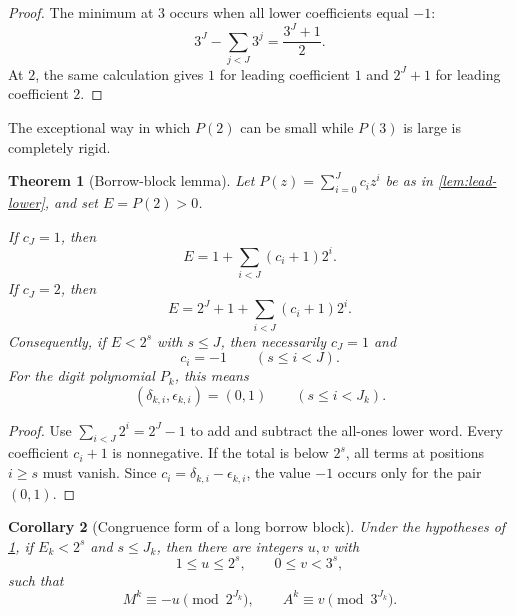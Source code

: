 \documentclass[11pt]{article}
\newtheorem{theorem}{Theorem}[section]
\newtheorem{corollary}[theorem]{Corollary}
\theoremstyle{definition}
\begin{document}
\begin{proof}
The minimum at \(3\) occurs when all lower coefficients equal \(-1\):
\[
 3^J-\sum_{j<J}3^j=\frac{3^J+1}{2}.
\]
At \(2\), the same calculation gives \(1\) for leading coefficient \(1\)
and \(2^J+1\) for leading coefficient \(2\).
\end{proof}

The exceptional way in which \(P(2)\) can be small while \(P(3)\) is large
is completely rigid.

\begin{theorem}[Borrow-block lemma]\label{thm:borrow-block}
Let \(P(z)=\sum_{i=0}^Jc_iz^i\) be as in
\cref{lem:lead-lower}, and set \(E=P(2)>0\).

If \(c_J=1\), then
\begin{equation}\label{eq:borrow-expansion1}
 E=1+\sum_{i<J}(c_i+1)2^i.
\end{equation}
If \(c_J=2\), then
\begin{equation}\label{eq:borrow-expansion2}
 E=2^J+1+\sum_{i<J}(c_i+1)2^i.
\end{equation}
Consequently, if \(E<2^s\) with \(s\le J\), then necessarily
\(c_J=1\) and
\begin{equation}\label{eq:borrow-block-coeff}
 c_i=-1\qquad(s\le i<J).
\end{equation}
For the digit polynomial \(P_k\), this means
\begin{equation}\label{eq:borrow-block-digits}
 (\delta_{k,i},\epsilon_{k,i})=(0,1)
 \qquad(s\le i<J_k).
\end{equation}
\end{theorem}

\begin{proof}
Use \(\sum_{i<J}2^i=2^J-1\) to add and subtract the all-ones lower word.
Every coefficient \(c_i+1\) is nonnegative.  If the total is below \(2^s\),
all terms at positions \(i\ge s\) must vanish.  Since
\(c_i=\delta_{k,i}-\epsilon_{k,i}\), the value \(-1\) occurs only for the
pair \((0,1)\).
\end{proof}

\begin{corollary}[Congruence form of a long borrow block]\label{cor:borrow-cong}
Under the hypotheses of \cref{thm:borrow-block}, if \(E_k<2^s\) and
\(s\le J_k\), then there are integers \(u,v\) with
\begin{equation}\label{eq:uv-ranges}
 1\le u\le2^s,
 \qquad 0\le v<3^s,
\end{equation}
such that
\begin{equation}\label{eq:borrow-congruences}
 M^k\equiv-u\pmod{2^{J_k}},
 \qquad
 A^k\equiv v\pmod{3^{J_k}}.
\end{equation}
\end{corollary}
\end{document}
